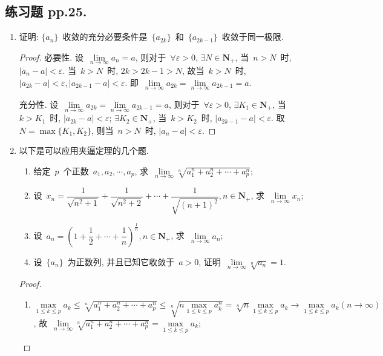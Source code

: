 \documentclass[UTF8,a4paper,10pt,twoside]{book}
\begin{document}
\subsection{练习题 pp.25.}
\begin{enumerate}
	\item	证明: $\{a_n\}$~收敛的充分必要条件是~$\{a_{2k}\}$~和~$\{a_{2k-1}\}$~收敛于同一极限.
	      \begin{proof}
		      必要性. 设~$\lim\limits_{n\to\infty} a_n=a$, 则对于~$\forall\varepsilon>0$, $\exists N\in\mathbf{N}_{+}$, 当~$n>N$~时, $|a_n-a|<\varepsilon$. 当~$k>N$~时, $2k>2k-1>N$, 故当~$k>N$~时, $|a_{2k}-a|<\varepsilon, |a_{2k-1}-a|<\varepsilon$. 即~$\lim\limits_{n\to\infty} a_{2k}=\lim\limits_{n\to\infty} a_{2k-1}=a$.

		      充分性. 设~$\lim\limits_{n\to\infty} a_{2k}=\lim\limits_{n\to\infty} a_{2k-1}=a$, 则对于~$\forall\varepsilon>0$, $\exists K_1\in\mathbf{N}_{+}$, 当~$k>K_1$~时, $|a_{2k}-a|<\varepsilon$; $\exists K_2\in\mathbf{N}_{+}$, 当~$k>K_2$~时, $|a_{2k-1}-a|<\varepsilon$. 取~$N=\max\{K_1,K_2\}$, 则当~$n>N$~时, $|a_n-a|<\varepsilon$.\qedhere
	      \end{proof}
	\item 以下是可以应用夹逼定理的几个题.
	      \begin{enumerate}[(1)]
		      \item 给定~$p$~个正数~$a_1,a_2,\cdots,a_p$, 求~$\lim\limits_{n\to\infty} \sqrt[n]{a_1^n+a_2^n+\cdots+a_p^n}$;
		      \item 设~$x_n=\dfrac{1}{\sqrt{n^2+1}}+\dfrac{1}{\sqrt{n^2+2}}+\cdots+\dfrac{1}{\sqrt{(n+1)^2}}, n\in\mathbf{N}_{+}$, 求~$\lim\limits_{n\to\infty} x_n$;
		      \item 设~$a_n=\left(1+\dfrac{1}{2}+\cdots+\dfrac{1}{n}\right)^\frac{1}{n}, n\in\mathbf{N}_{+}$, 求~$\lim\limits_{n\to\infty} a_n$;
		      \item 设~$\{a_n\}$~为正数列, 并且已知它收敛于~$a>0$, 证明~$\lim\limits_{n\to\infty} \sqrt[n]{a_n}=1$.
	      \end{enumerate}
	      \begin{proof}
		      \begin{enumerate}[(1)]
			      \item $\max\limits_{1\leqslant k\leqslant p} a_k\leqslant\sqrt[n]{a_1^n+a_2^n+\cdots+a_p^n}\leqslant\sqrt[n]{n\max\limits_{1\leqslant k\leqslant p} a_k^n}=\sqrt[n]{n}\max\limits_{1\leqslant k\leqslant p} a_k\to\max\limits_{1\leqslant k\leqslant p} a_k (n\to\infty)$, 故~$\lim\limits_{n\to\infty} \sqrt[n]{a_1^n+a_2^n+\cdots+a_p^n}=\max\limits_{1\leqslant k\leqslant p} a_k$;

\end{enumerate}
\end{proof}
\end{enumerate}
\end{document}
